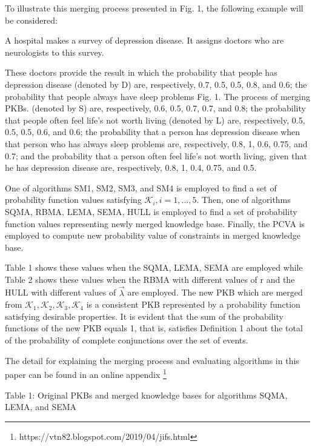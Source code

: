 \documentclass[]{iosart2c}
\begin{document}
To illustrate this merging process presented in Fig. 1, the following example will be considered: 

A hospital makes a survey of depression disease. It assigns doctors who are neurologists to this survey. 

These doctors provide the result in which the probability that people has depression disease (denoted by D) are, respectively, 0.7, 0.5, 0.5, 0.8, and 0.6; the probability that people always have sleep problems Fig. 1. The process of merging PKBs.
(denoted by S) are, respectively, 0.6, 0.5, 0.7, 0.7, and 0.8; the probability that people often feel life’s not worth living (denoted by L) are, respectively, 0.5, 0.5, 0.5, 0.6, and 0.6; the probability that a person has depression disease when that person who has always sleep problems are, respectively, 0.8, 1, 0.6, 0.75, and 0.7; and the probability that a person often feel life’s not worth living, given that he has depression disease are, respectively, 0.8, 1, 0.4, 0.75, and 0.5. 

One of algorithms SM1, SM2, SM3, and SM4 is employed to find a set of probability function values satisfying $\mathcal{K}_i, i = 1, ..., 5$. Then, one of algorithms SQMA, RBMA, LEMA, SEMA, HULL is employed to find a set of probability function values representing newly merged knowledge base. Finally, the PCVA is employed to compute new probability value of constraints in merged knowledge base.

Table 1 shows these values when the SQMA, LEMA, SEMA are employed while Table 2 shows these values when the RBMA with different values of r and the HULL with different values of $\vec{\lambda}$ are employed. The new PKB which are merged from $\mathcal{K}_1,\mathcal{K}_2,\mathcal{K}_3,\mathcal{K}_4$ is a consistent PKB represented by a probability function satisfying desirable properties. It is evident that the sum of the probability functions of the new PKB equals 1, that is, satisfies Definition 1 about the total of the probability of complete conjunctions over the set of events. 

The detail for explaining the merging process and evaluating algorithms in this paper can be found in an online appendix \footnote{https://vtn82.blogspot.com/2019/04/jifs.html}

Table 1: Original PKBs and merged knowledge bases for algorithms SQMA, LEMA, and SEMA
\end{document}
